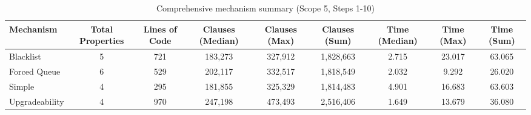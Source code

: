 \begin{table}[htbp]
\centering
\begin{tabular}{|l|c|c|c|c|c|c|c|c|}
\hline
\textbf{Mechanism} & \textbf{Total Properties} & \textbf{Lines of Code} & \textbf{Clauses (Median)} & \textbf{Clauses (Max)} & \textbf{Clauses (Sum)} & \textbf{Time (Median)} & \textbf{Time (Max)} & \textbf{Time (Sum)} \\
\hline
Blacklist & 5 & 721 & 183,273 & 327,912 & 1,828,663 & 2.715 & 23.017 & 63.065 \\
Forced Queue & 6 & 529 & 202,117 & 332,517 & 1,818,549 & 2.032 & 9.292 & 26.020 \\
Simple & 4 & 295 & 181,855 & 325,329 & 1,814,483 & 4.901 & 16.683 & 63.603 \\
Upgradeability & 4 & 970 & 247,198 & 473,493 & 2,516,406 & 1.649 & 13.679 & 36.080 \\
\hline
\end{tabular}
\caption{Comprehensive mechanism summary (Scope 5, Steps 1-10)}
\label{tab:comprehensive_mechanism_summary_steps_10}
\end{table}